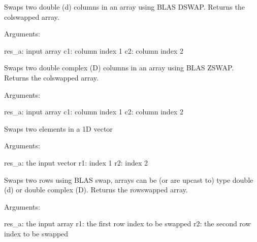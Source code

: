 \documentclass[a4paper,11pt,english]{sphinxmanual}
\begin{document}
\begin{fulllineitems}
\begin{fulllineitems}
\label{modules_doc:cbmpy.PyscesStoich.MathArrayFunc.SwapCold}
Swaps two double (d) columns in an array using BLAS DSWAP. Returns the colswapped array.

Arguments:

res\_a: input array
c1: column index 1
c2: column index 2

\end{fulllineitems}


\begin{fulllineitems}
\label{modules_doc:cbmpy.PyscesStoich.MathArrayFunc.SwapColz}
Swaps two double complex (D) columns in an array using BLAS ZSWAP. Returns the colswapped array.

Arguments:

res\_a: input array
c1: column index 1
c2: column index 2

\end{fulllineitems}


\begin{fulllineitems}
\label{modules_doc:cbmpy.PyscesStoich.MathArrayFunc.SwapElem}
Swaps two elements in a 1D vector

Arguments:

res\_a: the input vector
r1: index 1
r2: index 2

\end{fulllineitems}


\begin{fulllineitems}
\label{modules_doc:cbmpy.PyscesStoich.MathArrayFunc.SwapRow}
Swaps two rows using BLAS swap, arrays can be (or are upcast to) type double (d) or double complex (D).
Returns the rowswapped array.

Arguments:

res\_a: the input array
r1: the first row index to be swapped
r2:  the second row index to be swapped


\end{fulllineitems}
\end{fulllineitems}
\end{document}
